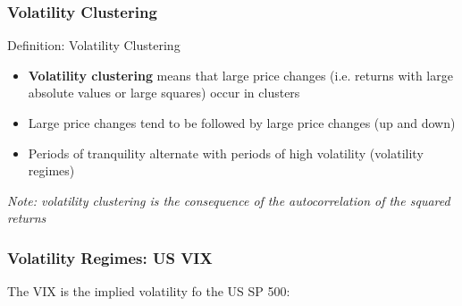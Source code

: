 \documentclass{beamer}
\begin{document}
\begin{frame}
  \frametitle{Volatility Clustering}
  \begin{block}{Definition: Volatility Clustering}
    \begin{itemize}
    \item \textbf{Volatility clustering} means that large price changes (i.e. returns with large absolute values or large squares) occur in clusters
    \item Large price changes tend to be followed by large price changes (up and down)
    \item Periods of tranquility alternate with periods of high volatility (volatility regimes)
    \end{itemize}
    
    \emph{Note: volatility clustering is the consequence of the autocorrelation of the squared returns}\\
    
  \end{block}
\end{frame}


\begin{frame}
  \frametitle{Volatility Regimes: US VIX}
  The VIX is the implied volatility fo the US SP 500:\\ 
\end{frame}
\end{document}
